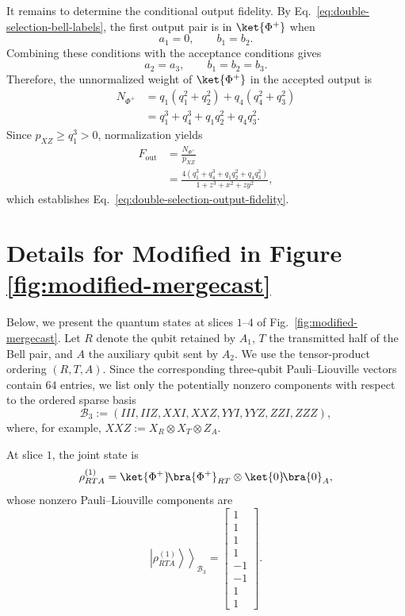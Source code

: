 It remains to determine the conditional output fidelity.
By Eq.~\eqref{eq:double-selection-bell-labels}, the first output
pair is in \(\ket{\Phi^+}\) when
\[
a_1=0,
\qquad
b_1=b_2.
\]
Combining these conditions with the acceptance conditions gives
\[
a_2=a_3,
\qquad
b_1=b_2=b_3.
\]
Therefore, the unnormalized weight of \(\ket{\Phi^+}\) in the
accepted output is
\begin{equation}
\begin{aligned}
N_{\Phi^+}
&=
q_1(q_1^2+q_2^2)+q_4(q_4^2+q_3^2)\\
&=
q_1^3+q_4^3+q_1q_2^2+q_4q_3^2.
\end{aligned}
\end{equation}
Since \(p_{XZ}\geq q_1^3>0\), normalization yields
\begin{equation}
\begin{aligned}
F_{\mathrm{out}}
&=
\frac{N_{\Phi^+}}{p_{XZ}}\\
&=
\frac{
4\left(q_1^3+q_4^3+q_1q_2^2+q_4q_3^2\right)
}{
1+z^3+x^2+zy^2
},
\end{aligned}
\end{equation}
which establishes
Eq.~\eqref{eq:double-selection-output-fidelity}.
\section{Details for Modified \mergecast in Figure \ref{fig:modified-mergecast}}
Below, we present the quantum states at slices \(1\)--\(4\) of
Fig.~\ref{fig:modified-mergecast}. Let \(R\) denote the qubit retained
by \(A_1\), \(T\) the transmitted half of the Bell pair, and \(A\) the
auxiliary qubit sent by \(A_2\). We use the tensor-product ordering
\((R,T,A)\). Since the corresponding three-qubit Pauli--Liouville
vectors contain \(64\) entries, we list only the potentially nonzero
components with respect to the ordered sparse basis
\begin{equation}
\mathcal B_3:=
\left(
III,IIZ,XXI,XXZ,YYI,YYZ,ZZI,ZZZ
\right),
\end{equation}
where, for example, \(XXZ:=X_R\otimes X_T\otimes Z_A\).

At slice \(1\), the joint state is
\begin{equation}
\rho_{RTA}^{(1)}
=
\ket{\Phi^+}\!\bra{\Phi^+}_{RT}
\otimes
\ket{0}\!\bra{0}_A,
\end{equation}
whose nonzero Pauli--Liouville components are
\begin{equation}
\left.\left|\rho_{RTA}^{(1)}\right\rangle\right\rangle_{\mathcal B_3}
=
\begin{bmatrix}
1\\
1\\
1\\
1\\
-1\\
-1\\
1\\
1
\end{bmatrix}.
\end{equation}

